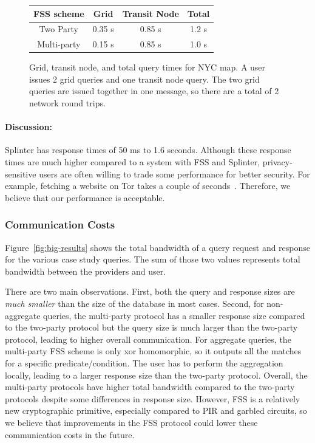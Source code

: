 \begin{figure}
	\centering
		\begin{tabular}{cccc}
			\toprule
			\bf FSS scheme & \bf Grid & \bf Transit Node & \bf Total \\
			\midrule
			Two Party & 0.35 s  & 0.85 s & 1.2 s \\
			Multi-party & 0.15 s & 0.85 s & 1.0 s \\
			\bottomrule
		\end{tabular}
	\caption[Grid, transit node, and total query times for NYC map.]
	{Grid, transit node, and total query times for NYC map. 
		A user issues 2 grid queries and one transit node query. The two grid queries
		are issued together in one message, so there are a total of 2 network round trips.}
	\label{fig:map-results}
\end{figure}

\paragraph{Discussion:}
Splinter has response times of 50 ms to 1.6 seconds. Although these response times are
much higher compared to a system with FSS and Splinter, 
privacy-sensitive users are often willing
to trade some performance for better security. For
example, fetching a website on Tor 
takes a couple of seconds~\cite{torStats}.
Therefore, we believe that our performance is 
acceptable.

\subsubsection{Communication Costs}
\label{sec:communication}
Figure~\ref{fig:big-results} shows the total bandwidth of a query request and response
for the various case study queries. The sum of those
two values represents total bandwidth between the providers and user.

There are two main observations. First, both the query and response sizes are \textit{much smaller} than the size
of the database in most cases. 
Second, for non-aggregate queries, the multi-party protocol has 
a smaller response size compared to the two-party protocol but the query size is much larger
than the two-party protocol, leading to higher overall communication. 
For aggregate queries, the multi-party FSS scheme is only xor homomorphic, so
it outputs all the matches for a specific predicate/condition. The user has to perform
the aggregation locally, leading to a larger response size than the two-party protocol.
Overall, the multi-party protocols have higher total bandwidth compared to the two-party protocols
despite some differences in response size. However, FSS is a relatively new cryptographic
primitive, especially compared to PIR and garbled circuits, so we believe that
improvements in the FSS protocol could 
lower these communication costs in the future.

